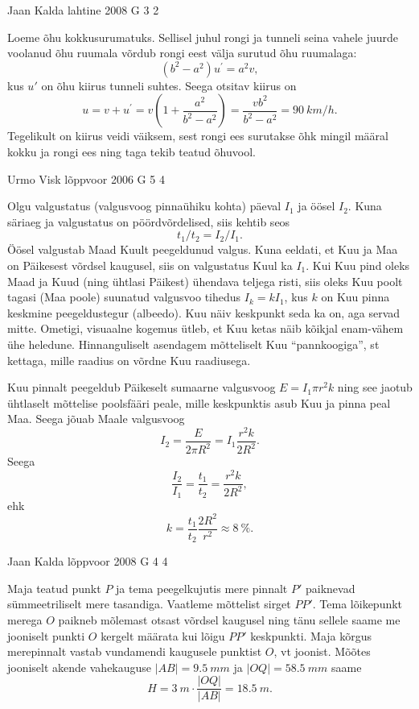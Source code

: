 \documentclass[11pt, twoside]{article}
\begin{document}
{%
{Jaan Kalda} %
{lahtine} %
{2008} %
{G 3} %
{2} %
{

\ifSolution
Loeme õhu kokkusurumatuks. Sellisel juhul rongi ja tunneli seina vahele juurde
voolanud õhu ruumala võrdub rongi eest välja surutud õhu ruumalaga:
\[
\left(b^{2}-a^{2}\right) u^{\prime}=a^{2} v,
\]
kus $u'$ on õhu kiirus tunneli suhtes. Seega otsitav kiirus on
\[
u=v+u^{\prime}=v\left(1+\frac{a^{2}}{b^{2}-a^{2}}\right)=\frac{v b^{2}}{b^{2}-a^{2}}=\SI{90}{km/h}.
\]
Tegelikult on kiirus veidi väiksem, sest rongi ees surutakse õhk mingil määral kokku ja rongi ees ning taga tekib teatud õhuvool.
\fi
}

{Urmo Visk} %
{lõppvoor} %
{2006} %
{G 5} %
{4} %
{

\ifSolution
Olgu valgustatus (valgusvoog pinnaühiku kohta) päeval $I_1$ ja öösel $I_2$. Kuna säriaeg ja valgustatus on pöördvõrdelised, siis kehtib seos
\[
t_1/t_2 = I_2/I_1.
\]
Öösel valgustab Maad Kuult peegeldunud valgus. Kuna eeldati, et Kuu ja Maa on Päikesest võrdsel kaugusel, siis on valgustatus Kuul ka $I_1$. Kui Kuu pind oleks Maad ja Kuud (ning ühtlasi Päikest) ühendava teljega risti, siis oleks Kuu poolt tagasi (Maa poole) suunatud valgusvoo tihedus $I_k = kI_1$, kus $k$ on Kuu pinna keskmine peegeldustegur (albeedo). Kuu näiv keskpunkt seda ka on, aga servad mitte. Ometigi, visuaalne kogemus ütleb, et Kuu ketas näib kõikjal enam-vähem ühe heledune. Hinnanguliselt asendagem mõtteliselt Kuu \enquote{pannkoogiga}, st kettaga, mille raadius on võrdne Kuu raadiusega.

Kuu pinnalt peegeldub Päikeselt sumaarne valgusvoog $E = I_1 \pi r^2k$ ning see jaotub ühtlaselt mõttelise poolsfääri peale, mille keskpunktis asub Kuu ja pinna peal Maa. Seega jõuab Maale valgusvoog
\[
I_2 = \frac{E}{2\pi R^2} = I_1 \frac{r^2k}{2R^2}.
\]
Seega
\[
\frac{I_2}{I_1} = \frac{t_1}{t_2} = \frac{r^2k}{2R^2},
\]
ehk
\[
k = \frac{t_1}{t_2} \frac{2R^2}{r^2} \approx \SI{8}{\%}.
\]
\fi
}

{Jaan Kalda} %
{lõppvoor} %
{2008} %
{G 4} %
{4} %
{

\ifSolution
Maja teatud punkt $P$ ja tema peegelkujutis mere pinnalt $P'$ paiknevad sümmeetriliselt mere tasandiga. Vaatleme mõttelist sirget $PP'$. Tema lõikepunkt merega $O$ paikneb mõlemast otsast võrdsel kaugusel ning tänu sellele saame me jooniselt punkti $O$ kergelt määrata kui lõigu $PP'$ keskpunkti. Maja kõrgus merepinnalt vastab vundamendi kaugusele punktist $O$, vt joonist. Mõõtes jooniselt akende vahekauguse $|AB| = \SI{9,5}{mm}$ ja $|OQ| = \SI{58,5}{mm}$ saame
\[
H = \SI{3}{m} \cdot \frac{|OQ|}{|AB|} = \SI{18,5}{m}.
\]

}}
\end{document}
